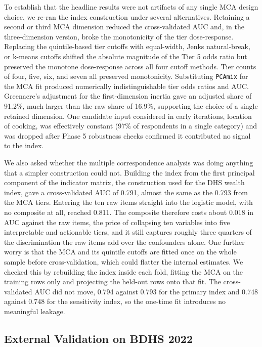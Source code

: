 \documentclass[
  12pt,
  a4paper]{article}
\begin{document}
To establish that the headline results were not artifacts of any single MCA design choice, we re-ran the index construction under several alternatives. Retaining a second or third MCA dimension reduced the cross-validated AUC and, in the three-dimension version, broke the monotonicity of the tier dose-response. Replacing the quintile-based tier cutoffs with equal-width, Jenks natural-break, or k-means cutoffs shifted the absolute magnitude of the Tier 5 odds ratio but preserved the monotone dose-response across all four cutoff methods. Tier counts of four, five, six, and seven all preserved monotonicity. Substituting \texttt{PCAmix} for the MCA fit produced numerically indistinguishable tier odds ratios and AUC. Greenacre's adjustment for the first-dimension inertia gave an adjusted share of 91.2\%, much larger than the raw share of 16.9\%, supporting the choice of a single retained dimension. One candidate input considered in early iterations, location of cooking, was effectively constant (97\% of respondents in a single category) and was dropped after Phase 5 robustness checks confirmed it contributed no signal to the index.

We also asked whether the multiple correspondence analysis was doing anything that a simpler construction could not. Building the index from the first principal component of the indicator matrix, the construction used for the DHS wealth index, gave a cross-validated AUC of 0.791, almost the same as the 0.793 from the MCA tiers. Entering the ten raw items straight into the logistic model, with no composite at all, reached 0.811. The composite therefore costs about 0.018 in AUC against the raw items, the price of collapsing ten variables into five interpretable and actionable tiers, and it still captures roughly three quarters of the discrimination the raw items add over the confounders alone. One further worry is that the MCA and its quintile cutoffs are fitted once on the whole sample before cross-validation, which could flatter the internal estimates. We checked this by rebuilding the index inside each fold, fitting the MCA on the training rows only and projecting the held-out rows onto that fit. The cross-validated AUC did not move, 0.794 against 0.793 for the primary index and 0.748 against 0.748 for the sensitivity index, so the one-time fit introduces no meaningful leakage.

\subsection{External Validation on BDHS 2022}\label{external-validation-on-bdhs-2022}
\end{document}
